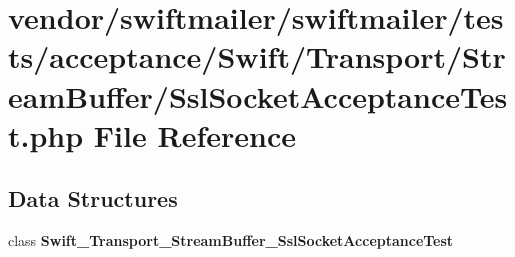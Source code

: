 \section{vendor/swiftmailer/swiftmailer/tests/acceptance/\+Swift/\+Transport/\+Stream\+Buffer/\+Ssl\+Socket\+Acceptance\+Test.php File Reference}
\label{_ssl_socket_acceptance_test_8php}
\subsection*{Data Structures}
\begin{DoxyCompactItemize}
\item 
class {\bf Swift\+\_\+\+Transport\+\_\+\+Stream\+Buffer\+\_\+\+Ssl\+Socket\+Acceptance\+Test}
\end{DoxyCompactItemize}
